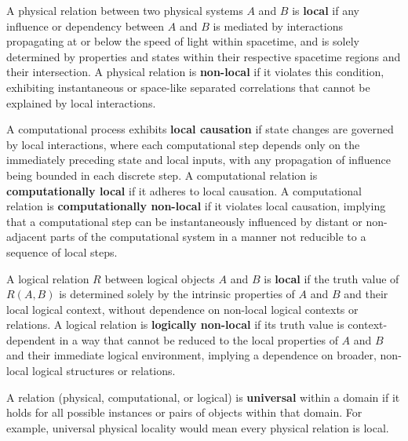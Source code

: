 	\begin{definition}
		A physical relation between two physical systems $A$ and $B$ is \textbf{local} if any influence or dependency between $A$ and $B$ is mediated by interactions propagating at or below the speed of light within spacetime, and is solely determined by properties and states within their respective spacetime regions and their intersection. A physical relation is \textbf{non-local} if it violates this condition, exhibiting instantaneous or space-like separated correlations that cannot be explained by local interactions.
	\end{definition}
	
	\begin{definition}
		A computational process exhibits \textbf{local causation} if state changes are governed by local interactions, where each computational step depends only on the immediately preceding state and local inputs, with any propagation of influence being bounded in each discrete step. A computational relation is \textbf{computationally local} if it adheres to local causation. A computational relation is \textbf{computationally non-local} if it violates local causation, implying that a computational step can be instantaneously influenced by distant or non-adjacent parts of the computational system in a manner not reducible to a sequence of local steps.
	\end{definition}
	
	\begin{definition}
		A logical relation $R$ between logical objects $A$ and $B$ is \textbf{local} if the truth value of $R(A, B)$ is determined solely by the intrinsic properties of $A$ and $B$ and their local logical context, without dependence on non-local logical contexts or relations. A logical relation is \textbf{logically non-local} if its truth value is context-dependent in a way that cannot be reduced to the local properties of $A$ and $B$ and their immediate logical environment, implying a dependence on broader, non-local logical structures or relations.
	\end{definition}
	
	\begin{definition}
		A relation (physical, computational, or logical) is \textbf{universal} within a domain if it holds for all possible instances or pairs of objects within that domain. For example, universal physical locality would mean every physical relation is local.
	\end{definition}
	
